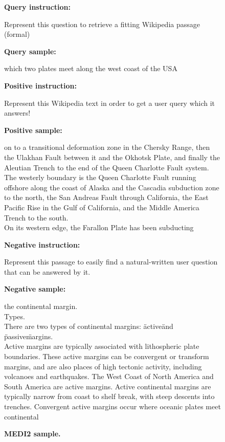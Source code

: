 \documentclass{article}
\begin{document}
\begin{figure}[htbp]
\hrulefill

\textbf{Query instruction:}

\hrulefill

Represent this question to retrieve a fitting Wikipedia passage (formal)

\hrulefill

\textbf{Query sample:}

\hrulefill

which two plates meet along the west coast of the USA

\hrulefill

\textbf{Positive instruction:}

\hrulefill

Represent this Wikipedia text in order to get a user query which it answers!

\hrulefill

\textbf{Positive sample:}

\hrulefill

on to a transitional deformation zone in the Chersky Range, then the Ulakhan Fault between it and the Okhotsk Plate, and finally the Aleutian Trench to the end of the Queen Charlotte Fault system.\\
The westerly boundary is the Queen Charlotte Fault running offshore along the coast of Alaska and the Cascadia subduction zone to the north, the San Andreas Fault through California, the East Pacific Rise in the Gulf of California, and the Middle America Trench to the south.\\
On its western edge, the Farallon Plate has been subducting

\hrulefill

\textbf{Negative instruction:}

\hrulefill

Represent this passage to easily find a natural-written user question that can be answered by it.

\hrulefill

\textbf{Negative sample:}

\hrulefill

the continental margin.\\
Types.\\
There are two types of continental margins: \"active\" and \"passive\" margins.\\
Active margins are typically associated with lithospheric plate boundaries. These active margins can be convergent or transform margins, and are also places of high tectonic activity, including volcanoes and earthquakes. The West Coast of North America and South America are active margins. Active continental margins are typically narrow from coast to shelf break, with steep descents into trenches. Convergent active margins occur where oceanic plates meet continental

\hrulefill

\caption{\textbf{MEDI2 sample.}}
\label{fig:medi2}
\end{figure}
\end{document}
